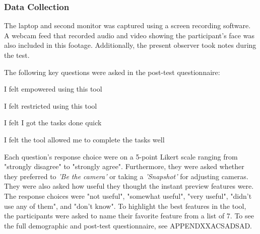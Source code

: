 \subsubsection{Data Collection}
The laptop and second monitor was captured using a screen recording software. A webcam feed  that recorded audio and video showing the participant's face was also included in this footage. Additionally, the present observer took notes during the test.

The following key questions were asked in the post-test questionnaire:

\setlength{\parindent}{1cm}
I felt empowered using this tool

\setlength{\parskip}{0pt}
I felt restricted using this tool

I felt I got the tasks done quick

I felt the tool allowed me to complete the tasks well

\setlength{\parskip}{15pt}
\setlength{\parindent}{0cm}
Each question's response choice were on a 5-point Likert scale ranging from "strongly disagree" to "strongly agree". Furthermore, they were asked whether they preferred to \textit{'Be the camera'} or taking a \textit{'Snapshot'} for adjusting cameras. They were also asked how useful they thought the instant preview features were. The response choices were "not useful", "somewhat useful", "very useful", "didn't use any of them", and "don't know". To highlight the best features in the tool, the participants were asked to name their favorite feature from a list of 7. To see the full demographic and post-test questionnaire, see APPENDXXACSADSAD. 
